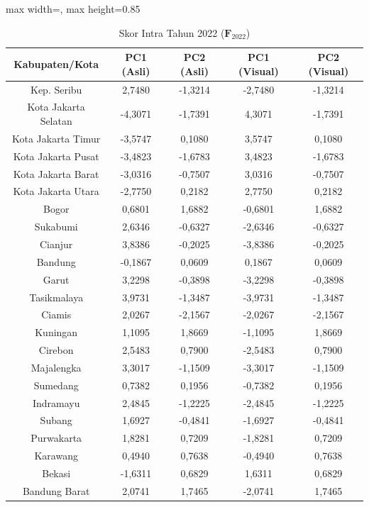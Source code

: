 \begin{table}[H]
\centering
\caption{Skor Intra Tahun 2022 ($\mathbf{F}_{2022}$)} \label{tab:app2skor_intra_2022}
\begin{adjustbox}{max width=\textwidth, max height=0.85\textheight}
\begin{tabular}{|c|c|c|c|c|}
\hline
\textbf{Kabupaten/Kota} & \textbf{PC1 (Asli)} & \textbf{PC2 (Asli)} & \textbf{PC1 (Visual)} & \textbf{PC2 (Visual)} \\
\hline
Kep. Seribu & 2,7480 & -1,3214 & -2,7480 & -1,3214 \\
Kota Jakarta Selatan & -4,3071 & -1,7391 & 4,3071 & -1,7391 \\
Kota Jakarta Timur & -3,5747 & 0,1080 & 3,5747 & 0,1080 \\
Kota Jakarta Pusat & -3,4823 & -1,6783 & 3,4823 & -1,6783 \\
Kota Jakarta Barat & -3,0316 & -0,7507 & 3,0316 & -0,7507 \\
Kota Jakarta Utara & -2,7750 & 0,2182 & 2,7750 & 0,2182 \\
Bogor & 0,6801 & 1,6882 & -0,6801 & 1,6882 \\
Sukabumi & 2,6346 & -0,6327 & -2,6346 & -0,6327 \\
Cianjur & 3,8386 & -0,2025 & -3,8386 & -0,2025 \\
Bandung & -0,1867 & 0,0609 & 0,1867 & 0,0609 \\
Garut & 3,2298 & -0,3898 & -3,2298 & -0,3898 \\
Tasikmalaya & 3,9731 & -1,3487 & -3,9731 & -1,3487 \\
Ciamis & 2,0267 & -2,1567 & -2,0267 & -2,1567 \\
Kuningan & 1,1095 & 1,8669 & -1,1095 & 1,8669 \\
Cirebon & 2,5483 & 0,7900 & -2,5483 & 0,7900 \\
Majalengka & 3,3017 & -1,1509 & -3,3017 & -1,1509 \\
Sumedang & 0,7382 & 0,1956 & -0,7382 & 0,1956 \\
Indramayu & 2,4845 & -1,2225 & -2,4845 & -1,2225 \\
Subang & 1,6927 & -0,4841 & -1,6927 & -0,4841 \\
Purwakarta & 1,8281 & 0,7209 & -1,8281 & 0,7209 \\
Karawang & 0,4940 & 0,7638 & -0,4940 & 0,7638 \\
Bekasi & -1,6311 & 0,6829 & 1,6311 & 0,6829 \\
Bandung Barat & 2,0741 & 1,7465 & -2,0741 & 1,7465 \\

\end{tabular}
\end{adjustbox}
\end{table}
